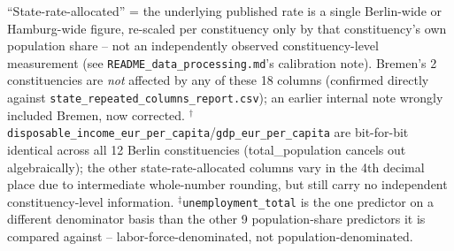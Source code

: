 \begin{table}[htbp]
\vspace{2pt}
\raggedright\footnotesize
``State-rate-allocated'' = the underlying published rate is a single Berlin-wide or Hamburg-wide figure, re-scaled per constituency only by that constituency's own population share -- not an independently observed constituency-level measurement (see \texttt{README\_data\_processing.md}'s calibration note). Bremen's 2 constituencies are \emph{not} affected by any of these 18 columns (confirmed directly against \texttt{state\_repeated\_columns\_report.csv}); an earlier internal note wrongly included Bremen, now corrected. $^{\dagger}$\texttt{disposable\_income\_eur\_per\_capita}/\texttt{gdp\_eur\_per\_capita} are bit-for-bit identical across all 12 Berlin constituencies (total\_population cancels out algebraically); the other state-rate-allocated columns vary in the 4th decimal place due to intermediate whole-number rounding, but still carry no independent constituency-level information. $^{\ddagger}$\texttt{unemployment\_total} is the one predictor on a different denominator basis than the other 9 population-share predictors it is compared against -- labor-force-denominated, not population-denominated.
\end{table}
